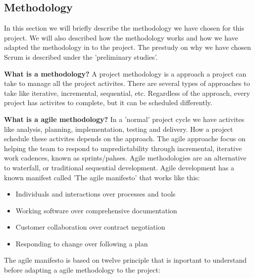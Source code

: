 \subsection{Methodology}

In this section we will briefly describe the methodology we have chosen 
for this project. We will also described how the methodology works and 
how we have adapted the methodology in to the project.
The prestudy on why we have chosen Scrum is described 
under the 'preliminary studies'. 



{\bf What is a methodology? } A project methodology is a approach a project can take to manage all the project activites. There are several types of approaches to take like iterative, incremental, sequential, etc. Regardless of the approach, every project has activites to complete, but it can be scheduled differently. 

{\bf What is a agile methodology? } In a 'normal' project cycle we have activites like analysis, planning, implementation, testing and delivery. How a project schedule these activites depends on the approach. 
The agile approache focus on helping the team to respond to unpredictability through incremental, iterative work cadences, known as sprints/pahses. Agile methodologies are an alternative to waterfall, or traditional sequential development.
Agile development has a known manifest called 'The agile manifesto' that works like this:

\begin{itemize}
	\item Individuals and interactions over processes and tools
    \item Working software over comprehensive documentation
    \item Customer collaboration over contract negotiation
    \item Responding to change over following a plan 
\end{itemize}

The agile manifesto is based on twelve principle that is inportant to understand before
adapting a agile methodology to the project:

